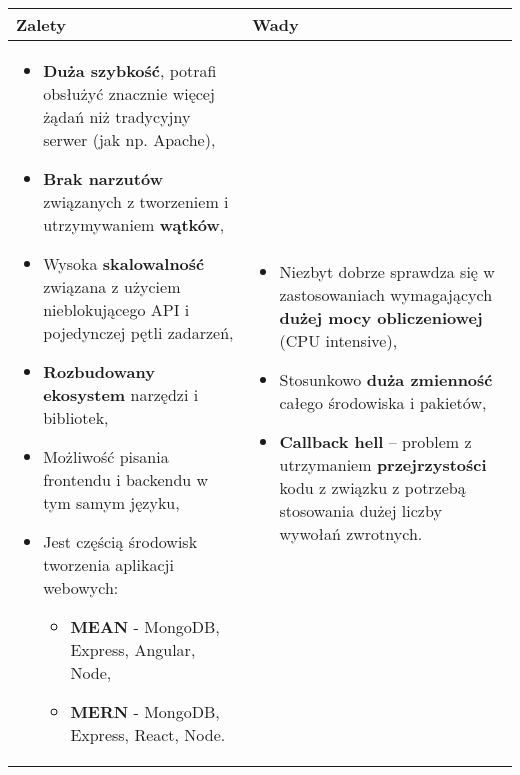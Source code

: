 \documentclass[../main.tex]{subfiles}
\begin{document}
    \begin{table}[H]
        \begin{center}
            \begin{tabular}{ p{9cm} | p{8cm} }
                \textbf{Zalety} & \textbf{Wady}\\
                \hline
                \begin{itemize}
                    \item \textbf{Duża szybkość}, potrafi obsłużyć znacznie więcej żądań niż tradycyjny serwer (jak np. Apache),
                    \item \textbf{Brak narzutów} związanych z tworzeniem i utrzymywaniem \textbf{wątków},
                    \item Wysoka \textbf{skalowalność} związana z użyciem nieblokującego API i pojedynczej pętli zadarzeń,
                    \item \textbf{Rozbudowany ekosystem} narzędzi i bibliotek,
                    \item Możliwość pisania frontendu i backendu w tym samym języku,
                    \item Jest częścią środowisk tworzenia aplikacji webowych:
                    \begin{itemize}
                        \item \textbf{MEAN} - MongoDB, Express, Angular, Node,
                        \item \textbf{MERN} - MongoDB, Express, React, Node.
                    \end{itemize}
                \end{itemize}
                &
                \begin{itemize}
                    \item Niezbyt dobrze sprawdza się w zastosowaniach wymagających \textbf{dużej mocy obliczeniowej} (CPU intensive),
                    \item Stosunkowo \textbf{duża zmienność} całego środowiska i pakietów,
                    \item \textbf{Callback hell} – problem z utrzymaniem \textbf{przejrzystości} kodu z związku z potrzebą stosowania dużej liczby wywołań zwrotnych.
                \end{itemize}\\
            \end{tabular}
        \end{center}
    \end{table}
\end{document}
